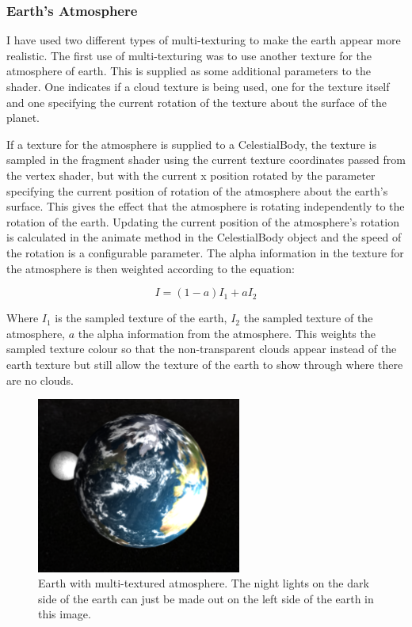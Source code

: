 \documentclass[paper=a4, fontsize=11pt]{scrartcl}	%
\numberwithin{equation}{section}															%
\numberwithin{figure}{section}																%
\numberwithin{table}{section}																%
\begin{document}
\subsubsection{Earth's Atmosphere}
I have used two different types of multi-texturing to make the earth appear more realistic. The first use of multi-texturing was to use another texture for the atmosphere of earth. This is supplied as some additional parameters to the shader. One indicates if a  cloud texture is being used, one for the texture itself and one specifying the current rotation of the texture about the surface of the planet.

If a texture for the atmosphere is supplied to a CelestialBody, the texture is sampled in the fragment shader using the current texture coordinates passed from the vertex shader, but with the current x position rotated by the parameter specifying the current position of rotation of the atmosphere about the earth's surface. This gives the effect that the atmosphere is rotating independently to the rotation of the earth. Updating the current position of the atmosphere's rotation is calculated in the animate method in the CelestialBody object and the speed of the rotation is a configurable parameter. The alpha information in the texture for the atmosphere is then weighted according to the equation:

\begin{equation} \label{eq:transparent-texture}
I = (1-a)I_1 + aI_2
\end{equation}

Where $I_1$ is the sampled texture of the earth, $I_2$ the sampled texture of the atmosphere, $a$ the alpha information from the atmosphere. This weights the sampled texture colour so that the non-transparent clouds appear instead of the earth texture but still allow the texture of the earth to show through where there are no clouds.

\begin{figure}[H]
\centering
\includegraphics[width=0.6\textwidth]{img/earth.png}
\caption{Earth with multi-textured atmosphere. The night lights on the dark side of the earth can just be made out on the left side of the earth in this image.}
\label{fig:earth-multi-texture}
\end{figure}
\end{document}
